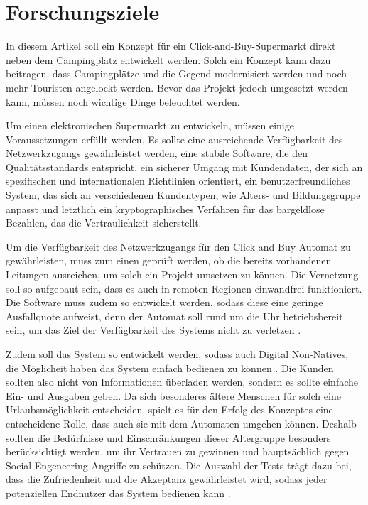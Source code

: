 \section{Forschungsziele}


In diesem Artikel soll ein Konzept für ein Click-and-Buy-Supermarkt direkt neben dem Campingplatz 
entwickelt werden. Solch ein Konzept kann dazu beitragen, dass Campingplätze und die Gegend modernisiert werden 
und noch mehr Touristen angelockt werden. Bevor das Projekt jedoch umgesetzt werden kann, müssen 
noch wichtige Dinge beleuchtet werden. 

Um einen elektronischen Supermarkt zu entwickeln, müssen einige Voraussetzungen erfüllt werden.
Es sollte eine ausreichende Verfügbarkeit des Netzwerkzugangs gewährleistet werden, eine stabile 
Software, die den Qualitätsstandards entspricht, ein sicherer Umgang mit Kundendaten, der sich an spezifischen 
und internationalen Richtlinien orientiert, ein benutzerfreundliches System, das sich an 
verschiedenen Kundentypen, wie Alters- und Bildungsgruppe anpasst und letztlich ein kryptographisches
Verfahren für das bargeldlose Bezahlen, das die Vertraulichkeit sicherstellt.


Um die Verfügbarkeit des Netzwerkzugangs für den Click and Buy Automat zu gewährleisten, muss zum einen 
geprüft werden, ob die bereits vorhandenen Leitungen ausreichen, um solch ein Projekt umsetzen zu können. Die
Vernetzung soll so aufgebaut sein, dass es auch in remoten Regionen einwandfrei funktioniert. Die
Software muss zudem so entwickelt werden, sodass diese eine geringe Ausfallquote aufweist, denn der Automat soll
rund um die Uhr betriebsbereit sein, um das Ziel der Verfügbarkeit des Systems nicht zu verletzen \cite{refbook:SWIS}.


Zudem soll das System so entwickelt werden, sodass auch Digital Non-Natives, die Möglicheit 
haben das System einfach bedienen zu können \cite{refart:QWDN}. Die Kunden sollten also nicht von 
Informationen überladen werden, sondern es sollte einfache Ein- und Ausgaben geben. Da sich besonderes ältere
Menschen für solch eine Urlaubsmöglichkeit entscheiden, spielt es für den Erfolg des Konzeptes eine entscheidene Rolle,
dass auch sie mit dem Automaten umgehen können. Deshalb sollten die Bedürfnisse und Einschränkungen dieser Altergruppe
besonders berücksichtigt werden, um ihr Vertrauen zu gewinnen \cite{refart:HLAU} und hauptsächlich
gegen Social Engeneering Angriffe zu schützen. Die Auswahl der Tests trägt dazu bei, dass die Zufriedenheit 
und die Akzeptanz gewährleistet wird, sodass jeder potenziellen Endnutzer das System bedienen kann 
\cite{refbook:IASE}.

